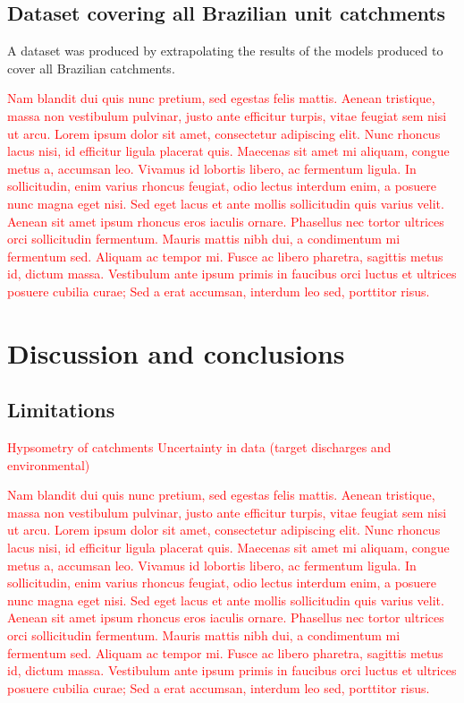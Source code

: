 \documentclass[12pt]{article}
\begin{document}
\subsection{Dataset covering all Brazilian unit catchments} \label{results:dataset}

\par A dataset was produced by extrapolating the results of the models produced to cover all Brazilian catchments.

\par \textcolor{red}{Nam blandit dui quis nunc pretium, sed egestas felis mattis. Aenean tristique, massa non vestibulum pulvinar, justo ante efficitur turpis, vitae feugiat sem nisi ut arcu. Lorem ipsum dolor sit amet, consectetur adipiscing elit. Nunc rhoncus lacus nisi, id efficitur ligula placerat quis. Maecenas sit amet mi aliquam, congue metus a, accumsan leo. Vivamus id lobortis libero, ac fermentum ligula. In sollicitudin, enim varius rhoncus feugiat, odio lectus interdum enim, a posuere nunc magna eget nisi. Sed eget lacus et ante mollis sollicitudin quis varius velit. Aenean sit amet ipsum rhoncus eros iaculis ornare. Phasellus nec tortor ultrices orci sollicitudin fermentum. Mauris mattis nibh dui, a condimentum mi fermentum sed. Aliquam ac tempor mi. Fusce ac libero pharetra, sagittis metus id, dictum massa. Vestibulum ante ipsum primis in faucibus orci luctus et ultrices posuere cubilia curae; Sed a erat accumsan, interdum leo sed, porttitor risus.}

\section{Discussion and conclusions} \label{discussion}
\subsection{Limitations} \label{discussion:limitations}

\par \textcolor{red}{Hypsometry of catchments
Uncertainty in data (target discharges and environmental)}


\par \textcolor{red}{Nam blandit dui quis nunc pretium, sed egestas felis mattis. Aenean tristique, massa non vestibulum pulvinar, justo ante efficitur turpis, vitae feugiat sem nisi ut arcu. Lorem ipsum dolor sit amet, consectetur adipiscing elit. Nunc rhoncus lacus nisi, id efficitur ligula placerat quis. Maecenas sit amet mi aliquam, congue metus a, accumsan leo. Vivamus id lobortis libero, ac fermentum ligula. In sollicitudin, enim varius rhoncus feugiat, odio lectus interdum enim, a posuere nunc magna eget nisi. Sed eget lacus et ante mollis sollicitudin quis varius velit. Aenean sit amet ipsum rhoncus eros iaculis ornare. Phasellus nec tortor ultrices orci sollicitudin fermentum. Mauris mattis nibh dui, a condimentum mi fermentum sed. Aliquam ac tempor mi. Fusce ac libero pharetra, sagittis metus id, dictum massa. Vestibulum ante ipsum primis in faucibus orci luctus et ultrices posuere cubilia curae; Sed a erat accumsan, interdum leo sed, porttitor risus.}
\end{document}
